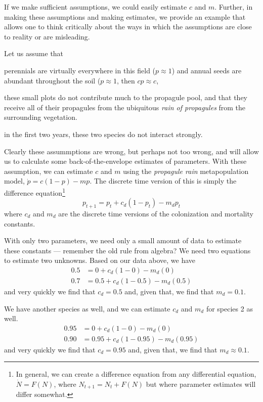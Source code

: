 If we make sufficient assumptions, we could easily estimate $c$ and $m$. Further, in making these assumptions and making estimates, we provide an example that allows one to think critically about the ways in which the assumptions are close to reality or are misleading.   

Let us assume that
\begin{compactenum}
  \item perennials are virtually everywhere in this field ($p\approx1$) and annual seeds are abundant throughout the soil ($p\approx 1$, then $cp \approx c$,
    \item these small plots do not contribute much to the propagule pool, and that they receive all of their propagules from the ubiquitous \emph{rain of propagules} from the surrounding vegetation.
      \item in the first two years, these two species do not interact strongly. 
\end{compactenum}
Clearly these assummptions are wrong, but perhaps not too wrong, and
will allow us to calculate some  back-of-the-envelope estimates of
parameters. With these assumption, we can estimate $c$ and $m$ using
the \emph{propagule rain} metapopulation model, $\dot{p} = c(1-p) -
mp$. The discrete time version of this is simply the difference equation\footnote{In general, we can create a difference equation from any differential equation, $\dot{N}=F(N)$, where $N_{t+1}=N_t + F(N)$ but where parameter estimates will differ somewhat.}
\begin{equation}
  p_{t+1}= p_t  +c_d(1-p_t)-m_dp_t
  \end{equation}
where $c_d$ and $m_d$ are the discrete time versions of the colonization  and mortality constants. 

With only two parameters, we need only a small amount of data to estimate these constants --- remember the old rule from algebra? We need two equations to estimate two unknowns. Based on our data above, we have
\begin{align*}
  0.5 &= 0 + c_d\left(1-0\right) - m_d\left(0\right)\\
  0.7 &= 0.5 + c_d\left(1-0.5\right) - m_d\left(0.5\right)
\end{align*}
and very quickly we find that $c_d=0.5$ and, given that, we find that $m_d=0.1$.

We have another species as well, and we can estimate $c_d$ and $m_d$ for species 2 as well.
\begin{align*}
  0.95 &= 0 + c_d\left(1-0\right) - m_d\left(0\right)\\
  0.90 &= 0.95 + c_d\left(1-0.95\right) - m_d\left(0.95\right)
\end{align*}
and very quickly we find that $c_d=0.95$ and, given that, we find that $m_d\approx 0.1$.

